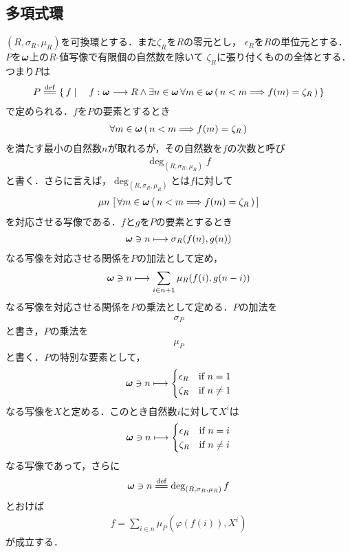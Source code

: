 \subsection{多項式環}
	$(R,\sigma_R,\mu_R)$を可換環とする．また$\zeta_R$を$R$の零元とし，
	$\epsilon_R$を$R$の単位元とする．
	$P$を${\boldsymbol \omega}$上の$R$-値写像で有限個の自然数を除いて
	$\zeta_R$に張り付くものの全体とする．つまり$P$は
	\begin{align}
		P \defeq \Set{f}{f:\Natural \longrightarrow R \wedge
		\exists n \in \Natural\, \forall m \in \Natural\,
		(\, n < m \Longrightarrow f(m) = \zeta_R\, )}
	\end{align}
	で定められる．$f$を$P$の要素とするとき
	\begin{align}
		\forall m \in {\boldsymbol \omega}\, (\, n < m \Longrightarrow f(m) = \zeta_R\, )
	\end{align}
	を満たす最小の自然数$n$が取れるが，その自然数を$f$の次数と呼び
	\begin{align}
		\deg_{(R,\sigma_R,\mu_R)}{f}
	\end{align}
	と書く．さらに言えば，$\deg_{(R,\sigma_R,\mu_R)}$とは$f$に対して
	\begin{align}
		\mu n\, \left[\, \forall m \in {\boldsymbol \omega}\, (\, n < m \Longrightarrow f(m) = \zeta_R\, )\, \right]
	\end{align}
	を対応させる写像である．$f$と$g$を$P$の要素とするとき
	\begin{align}
		{\boldsymbol \omega} \ni n \longmapsto \sigma_R(f(n),g(n))
	\end{align}
	なる写像を対応させる関係を$P$の加法として定め，
	\begin{align}
		{\boldsymbol \omega} \ni n \longmapsto \sum_{i \in n+1} \mu_R(f(i),g(n-i))
	\end{align}
	なる写像を対応させる関係を$P$の乗法として定める．$P$の加法を
	\begin{align}
		\sigma_P
	\end{align}
	と書き，$P$の乗法を
	\begin{align}
		\mu_P
	\end{align}
	と書く．$P$の特別な要素として，
	\begin{align}
		{\boldsymbol \omega} \ni n \longmapsto
		\begin{cases}
			\epsilon_R & \mbox{if } n = 1 \\
			\zeta_R & \mbox{if } n \neq 1
		\end{cases}
	\end{align}
	なる写像を$X$と定める．このとき自然数$i$に対して$X^i$は
	\begin{align}
		{\boldsymbol \omega} \ni n \longmapsto
		\begin{cases}
			\epsilon_R & \mbox{if } n = i \\
			\zeta_R & \mbox{if } n \neq i
		\end{cases}
	\end{align}
	なる写像であって，さらに
	\begin{align}
		\Natural \ni n \defeq \deg_{(R,\sigma_R,\mu_R)}{f}
	\end{align}
	とおけば
	\begin{align}
		f = \sum_{i \in n} \mu_P \left(\varphi(f(i)),X^i\right)
	\end{align}
	が成立する．
	
